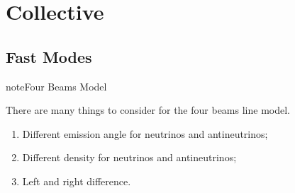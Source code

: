 \documentclass[letterpaper,12pt,english]{sphinxmanual}
\begin{document}
\chapter{Collective}
\label{\detokenize{collective/index:collective}}\label{\detokenize{collective/index::doc}}

\section{Fast Modes}
\label{\detokenize{collective/fast-modes::doc}}\label{\detokenize{collective/fast-modes:fast-modes}}
\begin{sphinxadmonition}{note}{Four Beams Model}

There are many things to consider for the four beams line model.
\begin{enumerate}
\item {} 
Different emission angle for neutrinos and antineutrinos;

\item {} 
Different density for neutrinos and antineutrinos;

\item {} 
Left and right difference.

\end{enumerate}
\end{sphinxadmonition}
\end{document}
